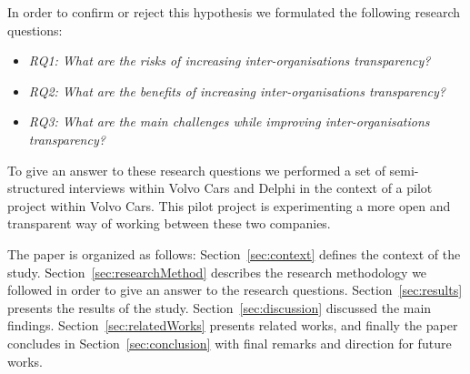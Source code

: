 In order to confirm or reject this hypothesis we formulated the following research questions: %

\begin{itemize}
\item {\em RQ1: What are the risks of increasing inter-organisations transparency?}
\item {\em RQ2: What are the benefits of increasing inter-organisations transparency?} %
\item {\em RQ3: What are the main challenges while improving inter-organisations transparency?}
\end{itemize}

To give an answer to these research questions we performed a set of semi-structured interviews within Volvo Cars and Delphi in the context of a pilot project within Volvo Cars. This pilot project is experimenting a more open and transparent way of working between these two companies.


The paper is organized as follows: Section~\ref{sec:context} defines the context of the study. Section~\ref{sec:researchMethod} describes the research methodology we followed in order to give an answer to the research questions. Section~\ref{sec:results} presents the results of the study. Section~\ref{sec:discussion} discussed the main findings. Section~\ref{sec:relatedWorks} presents related works, and finally the paper concludes in Section~\ref{sec:conclusion} with final remarks and direction for future works.
